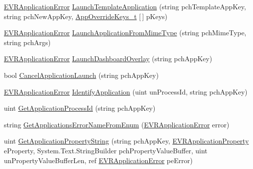 \begin{DoxyCompactItemize}
\item 
\mbox{\hyperlink{namespace_valve_1_1_v_r_a3488adab8a219b579fcee50f4e63a8b6}{E\+V\+R\+Application\+Error}} \mbox{\hyperlink{class_valve_1_1_v_r_1_1_c_v_r_applications_a423aa8da44ee6d43044a48592a2fabc1}{Launch\+Template\+Application}} (string pch\+Template\+App\+Key, string pch\+New\+App\+Key, \mbox{\hyperlink{struct_valve_1_1_v_r_1_1_app_override_keys__t}{App\+Override\+Keys\+\_\+t}} \mbox{[}$\,$\mbox{]} p\+Keys)
\item 
\mbox{\hyperlink{namespace_valve_1_1_v_r_a3488adab8a219b579fcee50f4e63a8b6}{E\+V\+R\+Application\+Error}} \mbox{\hyperlink{class_valve_1_1_v_r_1_1_c_v_r_applications_ae713c2611618b1e6e45694375fab52b7}{Launch\+Application\+From\+Mime\+Type}} (string pch\+Mime\+Type, string pch\+Args)
\item 
\mbox{\hyperlink{namespace_valve_1_1_v_r_a3488adab8a219b579fcee50f4e63a8b6}{E\+V\+R\+Application\+Error}} \mbox{\hyperlink{class_valve_1_1_v_r_1_1_c_v_r_applications_a33117092ab66989cc378f6f41f2fc772}{Launch\+Dashboard\+Overlay}} (string pch\+App\+Key)
\item 
bool \mbox{\hyperlink{class_valve_1_1_v_r_1_1_c_v_r_applications_af537811353d75ea94719196f08fd6729}{Cancel\+Application\+Launch}} (string pch\+App\+Key)
\item 
\mbox{\hyperlink{namespace_valve_1_1_v_r_a3488adab8a219b579fcee50f4e63a8b6}{E\+V\+R\+Application\+Error}} \mbox{\hyperlink{class_valve_1_1_v_r_1_1_c_v_r_applications_a095be14493fca1fabadbec251a216bb6}{Identify\+Application}} (uint un\+Process\+Id, string pch\+App\+Key)
\item 
uint \mbox{\hyperlink{class_valve_1_1_v_r_1_1_c_v_r_applications_aa87e0096153994caab063d57a3b7bd0b}{Get\+Application\+Process\+Id}} (string pch\+App\+Key)
\item 
string \mbox{\hyperlink{class_valve_1_1_v_r_1_1_c_v_r_applications_ac5275c11f9ff77cc7a68f11e1ba1ba5c}{Get\+Applications\+Error\+Name\+From\+Enum}} (\mbox{\hyperlink{namespace_valve_1_1_v_r_a3488adab8a219b579fcee50f4e63a8b6}{E\+V\+R\+Application\+Error}} error)
\item 
uint \mbox{\hyperlink{class_valve_1_1_v_r_1_1_c_v_r_applications_a623fedcbaacfe1e1b7d74ff709a9d869}{Get\+Application\+Property\+String}} (string pch\+App\+Key, \mbox{\hyperlink{namespace_valve_1_1_v_r_a60802f09ad1b4764cd5bc78369d50bf3}{E\+V\+R\+Application\+Property}} e\+Property, System.\+Text.\+String\+Builder pch\+Property\+Value\+Buffer, uint un\+Property\+Value\+Buffer\+Len, ref \mbox{\hyperlink{namespace_valve_1_1_v_r_a3488adab8a219b579fcee50f4e63a8b6}{E\+V\+R\+Application\+Error}} pe\+Error)

\end{DoxyCompactItemize}
